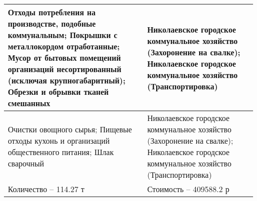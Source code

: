 \documentclass[a4paper]{G2-105}
\begin{document}
\begin{longtable}[l]{|p{7.5cm}|p{7.5cm}|}
\hline
Отходы потребления на производстве, подобные коммунальным; Покрышки с металлокордом отработанные; Мусор от бытовых помещений организаций несортированный (исключая крупногабаритный); Обрезки и обрывки тканей смешанных & Николаевское городское коммунальное хозяйство (Захоронение на свалке); Николаевское городское коммунальное хозяйство (Транспортировка) \tabularnewline
\hline
Очистки овощного сырья; Пищевые отходы кухонь и организаций общественного питания; Шлак сварочный & Николаевское городское коммунальное хозяйство (Захоронение на свалке); Николаевское городское коммунальное хозяйство (Транспортировка) \tabularnewline
\hline
Количество -- 114.27 т & Стоимость -- 409588.2 р \tabularnewline
\end{longtable}


\end{document}
